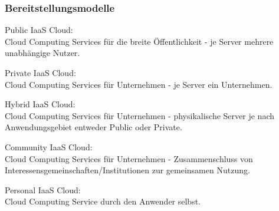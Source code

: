 \documentclass[13pt,a4paper,bibliography=totocnumbered,listof=totocnumbered]{scrartcl}
\begin{document}
\subsubsection{Bereitstellungsmodelle}
\begin{compactitem}
\item Public IaaS Cloud:\\
Cloud Computing Services für die breite Öffentlichkeit - je Server mehrere unabhängige Nutzer.
\item Private IaaS Cloud:\\
Cloud Computing Services für Unternehmen - je Server ein Unternehmen.
\item Hybrid IaaS Cloud:\\
Cloud Computing Services für Unternehmen - physikalische Server je nach Anwendungsgebiet entweder Public oder Private.
\item Community IaaS Cloud:\\
Cloud Computing Services für Unternehmen - Zusammenschluss von Interessensgemeinschaften/Institutionen zur gemeinsamen Nutzung.
\item Personal IaaS Cloud:\\
Cloud Computing Service durch den Anwender selbst.
\end{compactitem}

\cite{35} \cite[S. 3]{34}
\end{document}
